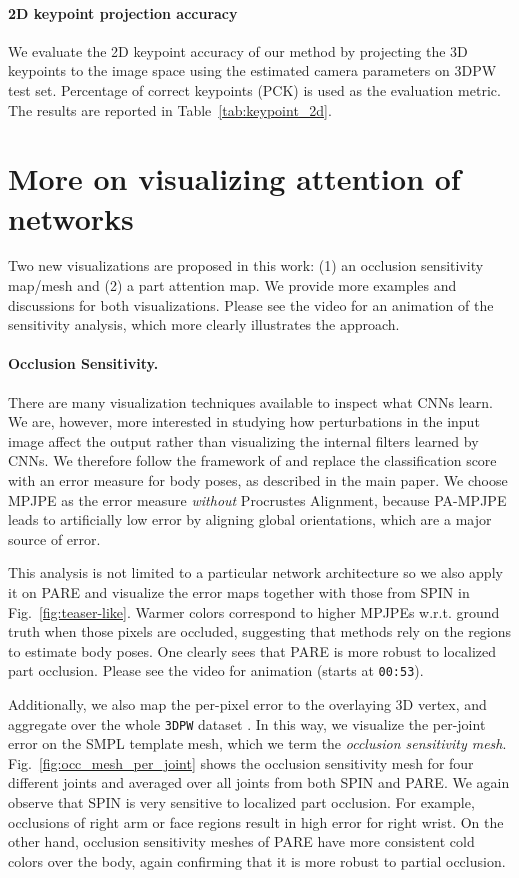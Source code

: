 \documentclass[10pt,twocolumn,letterpaper,usenames,dvipsnames]{article}
\newcommand{\methodname}{PARE\xspace}
\newcommand{\threedpw}{\texttt{3DPW}\xspace}
\begin{document}
\paragraph{2D keypoint projection accuracy} 
We evaluate the 2D keypoint accuracy of our method by projecting the 3D keypoints to the image space using the estimated camera parameters on 3DPW test set. Percentage of correct keypoints (PCK) is used as the evaluation metric. The results are reported in Table~\ref{tab:keypoint_2d}.

\section{More on visualizing attention of networks}
Two new visualizations are proposed in this work: (1) an occlusion sensitivity map/mesh and (2) a part attention map. We provide more examples and discussions for both visualizations.
Please see the video for an animation of the sensitivity analysis, which more clearly illustrates the approach.

\paragraph{Occlusion Sensitivity.}
There are many visualization techniques \cite{mahendran2015understanding,selvaraju2017grad,zeiler2014visualizing,zhou2016learning} available to inspect what CNNs learn. We are, however, more interested in studying how perturbations in the input image affect the output rather than visualizing the internal filters learned by CNNs. We therefore follow the framework of \cite{zeiler2014visualizing} and replace the classification score with an error measure for body poses, as described in the main paper. 
We choose MPJPE as the error measure \emph{without} Procrustes Alignment, because PA-MPJPE leads to artificially low error by aligning global orientations, which are a major source of error.

This analysis is not limited to a particular network architecture so we also apply it on \methodname and visualize the error maps together with those from SPIN \cite{SPIN:ICCV:2019} in Fig.~\ref{fig:teaser-like}.
Warmer colors correspond to higher MPJPEs w.r.t. ground truth when those pixels are occluded, suggesting that methods rely on the regions to estimate body poses. 
One clearly sees that \methodname is more robust to localized part occlusion. Please see the video for animation (starts at \texttt{00:53}).

Additionally, we also map the per-pixel error to the overlaying 3D vertex, and aggregate over the whole \threedpw dataset \cite{vonMarcard2018_3dpw}. 
In this way, we visualize the per-joint error on the SMPL template mesh, which we term the \emph{occlusion sensitivity mesh}.
Fig.~\ref{fig:occ_mesh_per_joint} shows the occlusion sensitivity mesh for four different joints and averaged over all joints from both SPIN and \methodname. 
We again observe that SPIN is very sensitive to localized part occlusion. For example, occlusions of right arm or face regions result in high error for right wrist. 
On the other hand, occlusion sensitivity meshes of \methodname have more consistent cold colors over the body, again confirming that it is more robust to partial occlusion.
\end{document}
